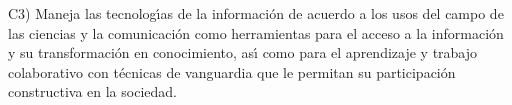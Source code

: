 C3) Maneja las tecnolog\'{\i}as de la informaci\'{o}n de acuerdo a los usos del
campo de las ciencias y la comunicaci\'{o}n como herramientas para el
acceso a la informaci\'{o}n y su transformaci\'{o}n en conocimiento, as\'{\i} como
para el aprendizaje y trabajo colaborativo con t\'{e}cnicas de vanguardia
que le permitan su participaci\'{o}n constructiva en la sociedad.
